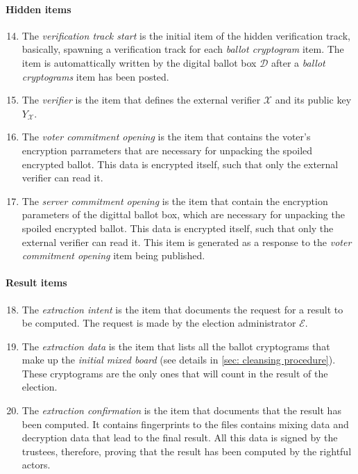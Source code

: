 \paragraph{Hidden items}
\begin{enumerate}
    \setcounter{enumi}{13}
    \item The \textit{verification track start} is the initial item of the hidden verification track, basically, spawning a verification track for each \textit{ballot cryptogram} item. The item is automattically written by the digital ballot box $\mathcal{D}$ after a \textit{ballot cryptograms} item has been posted.
    
    \item The \textit{verifier} is the item that defines the external verifier $\mathcal{X}$ and its public key $Y_\mathcal{X}$.

    \item The \textit{voter commitment opening} is the item that contains the voter's encryption parrameters that are necessary for unpacking the spoiled encrypted ballot. This data is encrypted itself, such that only the external verifier can read it.
    
    \item The \textit{server commitment opening} is the item that contain the encryption parameters of the digittal ballot box, which are necessary for unpacking the spoiled encrypted ballot. This data is encrypted itself, such that only the external verifier can read it. This item is generated as a response to the \textit{voter commitment opening} item being published.
\end{enumerate}

\paragraph{Result items}
\begin{enumerate}
    \setcounter{enumi}{17}
    \item The \textit{extraction intent} is the item that documents the request for a result to be computed. The request is made by the election administrator $\mathcal{E}$.
    
    \item The \textit{extraction data} is the item that lists all the ballot cryptograms that make up the \textit{initial mixed board} (see details in \cref{sec: cleansing procedure}). These cryptograms are the only ones that will count in the result of the election.

    \item The \textit{extraction confirmation} is the item that documents that the result has been computed. It contains fingerprints to the files contains mixing data and decryption data that lead to the final result. All this data is signed by the trustees, therefore, proving that the result has been computed by the rightful actors.
\end{enumerate}
